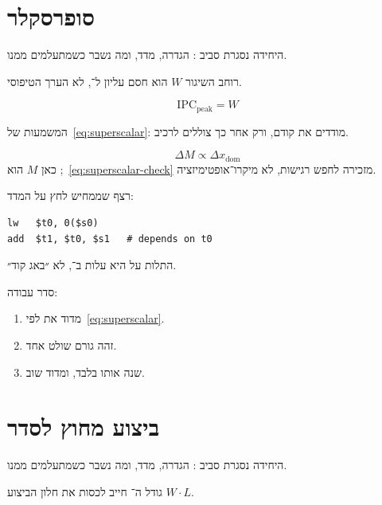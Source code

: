 \chapter{סופרסקלר}
\label{ch:superscalar}

היחידה נסגרת סביב : הגדרה, מדד, ומה נשבר כשמתעלמים ממנו.

\begin{defbox}[frametitle={הגדרה — סופרסקלר}]
רוחב השיגור $W$ הוא חסם עליון ל־, לא הערך הטיפוסי.
\end{defbox}

\begin{equation}
\label{eq:superscalar}
\mathrm{IPC}_{\mathrm{peak}} = W
\end{equation}

המשמעות של~\eqref{eq:superscalar}: מודדים את  קודם, ורק אחר כך צוללים לרכיב.

\begin{equation}
\label{eq:superscalar-check}
\Delta M \propto \Delta x_{\mathrm{dom}}
\end{equation}
כאן $M$ הוא ;~\eqref{eq:superscalar-check} מזכירה לחפש רגישות, לא מיקרו־אופטימיזציה.

רצף שממחיש לחץ על המדד:
\begin{asmblock}
\begin{lstlisting}[style=asm]
lw   $t0, 0($s0)
add  $t1, $t0, $s1   # depends on t0
\end{lstlisting}
\end{asmblock}
התלות על  היא עלות ב־, לא ״באג קוד״.

סדר עבודה:
\begin{enumerate}
\item[(\textbf{א})] מדוד את  לפי~\eqref{eq:superscalar}.
\item[(\textbf{ב})] זהה גורם שולט אחד.
\item[(\textbf{ג})] שנה אותו בלבד, ומדוד שוב.
\end{enumerate}

\chapter{ביצוע מחוץ לסדר}
\label{ch:ooo}

היחידה נסגרת סביב : הגדרה, מדד, ומה נשבר כשמתעלמים ממנו.

\begin{keybox}[frametitle={רעיון מפתח — ביצוע מחוץ לסדר}]
גודל ה־ חייב לכסות את חלון הביצוע $W\cdot L$.
\end{keybox}

